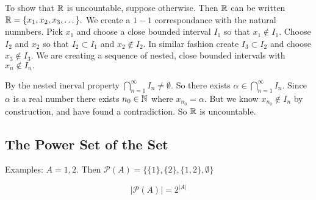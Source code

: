 \documentclass{report}
\begin{document}
\begin{myproof}
  To show that $\RR$ is uncountable, suppose otherwise. Then $\RR$ can be written $\RR = \{x_1, x_2, x_3,\dots\}.$ We create a $1-1$ correspondance with the natural numnbers. Pick $x_1$ and choose a close bounded interval $I_1$ so that $x_1 \not\in I_1.$ Choose $I_2$ and $x_2$ so that $I_2 \subset I_1$ and $x_2 \not \in  I_2.$ In similar fashion create $I_3 \subset I_2$ and choose $x_3 \not\in I_3.$  We are creating a sequence of nested, close bounded intervals with $x_n \not \in I_n.$ \par
  By the nested inerval property $\bigcap_{n=1}^{\infty} I_n \neq \emptyset.$ So there exists $\alpha \in \bigcap_{n=1}^{\infty} I_n.$ Since $\alpha$ is a real number there exists $n_0 \in \NN$ where $x_{n_0}=\alpha.$ But we know $x_{n_0} \not \in I_n$ by construction, and have found a contradiction. So $\RR$ is uncountable.
\end{myproof}

\subsection{The Power Set of the Set}


Examples: $A={1,2}$. Then $\mathcal{P}(A) =\{\{1\},\{2\},\{1,2\}, \emptyset\}$

$$|\mathcal{P}(A)| = 2^{|A|}$$

 
\end{document}
